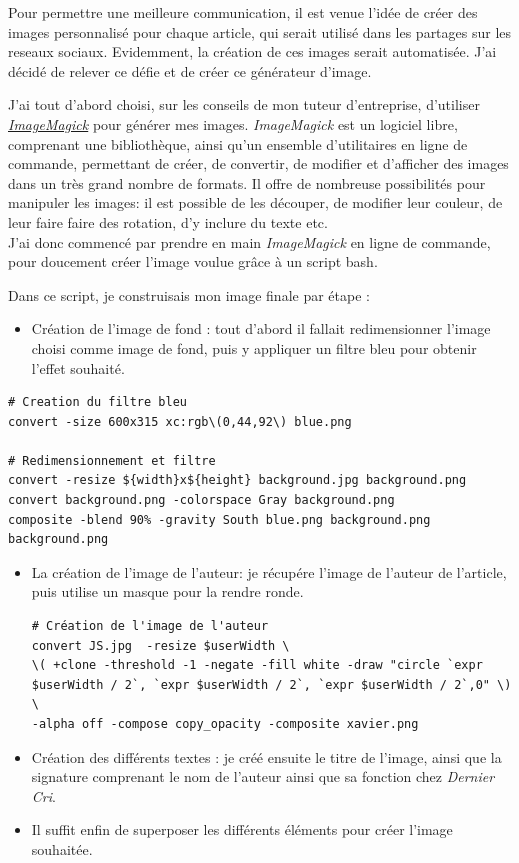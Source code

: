 \bigskip

Pour permettre une meilleure communication, il est venue l'idée de créer
des images personnalisé pour chaque article, qui serait utilisé dans les
partages sur les reseaux sociaux. Evidemment, la création de ces images
serait automatisée. J'ai décidé de relever ce défie et de créer ce
générateur d'image.

\bigskip

J'ai tout d'abord choisi, sur les conseils de mon tuteur d'entreprise,
d'utiliser
\href{https://www.imagemagick.org/script/index.php}{\emph{ImageMagick}}
pour générer mes images. \emph{ImageMagick} est un logiciel libre,
comprenant une bibliothèque, ainsi qu'un ensemble d'utilitaires en ligne
de commande, permettant de créer, de convertir, de modifier et
d'afficher des images dans un très grand nombre de formats. Il offre de
nombreuse possibilités pour manipuler les images: il est possible de les
découper, de modifier leur couleur, de leur faire faire des rotation,
d'y inclure du texte etc.\\
J'ai donc commencé par prendre en main \emph{ImageMagick} en ligne de
commande, pour doucement créer l'image voulue grâce à un script bash.

\bigskip

Dans ce script, je construisais mon image finale par étape :

\begin{itemize}
\tightlist
\item
  Création de l'image de fond : tout d'abord il fallait redimensionner
  l'image choisi comme image de fond, puis y appliquer un filtre bleu
  pour obtenir l'effet souhaité.
\end{itemize}

\begin{verbatim}
# Creation du filtre bleu
convert -size 600x315 xc:rgb\(0,44,92\) blue.png

# Redimensionnement et filtre
convert -resize ${width}x${height} background.jpg background.png
convert background.png -colorspace Gray background.png
composite -blend 90% -gravity South blue.png background.png background.png
\end{verbatim}

\begin{itemize}
\item
  La création de l'image de l'auteur: je récupére l'image de l'auteur de
  l'article, puis utilise un masque pour la rendre ronde.

\begin{verbatim}
# Création de l'image de l'auteur
convert JS.jpg  -resize $userWidth \
\( +clone -threshold -1 -negate -fill white -draw "circle `expr $userWidth / 2`, `expr $userWidth / 2`, `expr $userWidth / 2`,0" \) \
-alpha off -compose copy_opacity -composite xavier.png
\end{verbatim}
\item
  Création des différents textes : je créé ensuite le titre de l'image,
  ainsi que la signature comprenant le nom de l'auteur ainsi que sa
  fonction chez \emph{Dernier Cri}.
\item
  Il suffit enfin de superposer les différents éléments pour créer
  l'image souhaitée.
\end{itemize}

